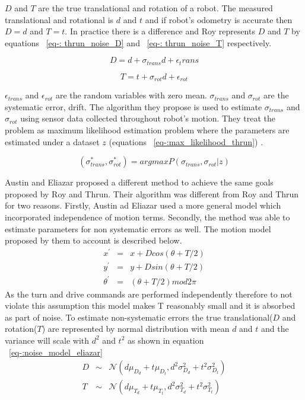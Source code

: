 \documentclass[12pt,draft]{dalcsthesis}
\begin{document}
$D$ and $T$ are the true translational and rotation of a robot. The measured translational and rotational is $d$ and $t$ and if robot's odometry is accurate then $D=d$ and $T=t$. In practice there is a difference and Roy represents $D$ and $T$ by equations ~\ref{eq-: thrun_noise_D} and ~\ref{eq-: thrun_noise_T} respectively.

\begin{equation}
\label{eq-: thrun_noise_D}
D= d+ \sigma_{trans}d+\epsilon_trans
\end{equation}

\begin{equation}
\label{eq-: thrun_noise_T}
  T= t+ \sigma_{rot}d+\epsilon_{rot}
\end{equation}

$\epsilon_{trans}$ and $\epsilon_{rot}$ are the random variables with zero mean. $\sigma_{trans}$ and $\sigma_{rot}$ are the systematic error, drift.  The algorithm they propose is used to estimate $\sigma_{trans}$ and $\sigma_{rot}$ using sensor data collected throughout robot's motion. They treat the problem as maximum likelihood estimation problem where the parameters are estimated under a dataset $z$ (equations ~\ref{eq-:max_likelihood_thrun}) .

\begin{equation}
\label{eq-:max_likelihood_thrun}
 (\sigma_{trans}^{*},\sigma_{rot}^{*}) = argmax P(\sigma_{trans},\sigma_{rot}|z)
\end{equation}

Austin and Eliazar \cite{Eliazar2004} proposed a different method to achieve the same goals proposed by Roy and Thrun. Their algorithm was different from Roy and Thrun for two reasons. Firstly, Austin ad Eliazar used a more general model which incorporated independence of motion terms. Secondly, the method was able to estimate parameters for non systematic errors as well. 
The motion model proposed by them to account is described below.
\begin{equation}
	\begin{aligned}
	x^{'}&=&x+Dcos(\theta+T/2) \\
	y^{'}&=&y+Dsin(\theta+T/2) \\
	\theta^{'}&=&(\theta+T/2)mod2\pi
	\end{aligned}
\end{equation}
As the turn and drive commands are performed independently therefore to not violate this assumption this model makes T reasonably small and it is absorbed as part of noise. To estimate non-systematic errors the true translational($D$ and rotation($T$) are represented by normal distribution with mean $d$ and $t$ and the variance will scale with $d^2$ and $t^2$ as shown in equation ~\ref{eq-:noise_model_eliazar}
\begin{equation}
\label{eq-:noise_model_eliazar}
\begin{aligned}
D &\sim& \mathcal{{N}}(d\mu_{D_{d}}+t\mu_{D_{t}},d^2\sigma_{D_{d}}^2+t^2\sigma_{D_{t}}^2)\\
T &\sim& \mathcal{{N}}(d\mu_{T_{d}}+t\mu_{T_{t}},d^2\sigma_{T_{d}}^2+t^2\sigma_{T_{t}}^2)
\end{aligned}
\end{equation}
\end{document}
